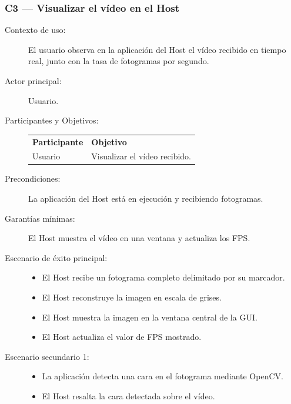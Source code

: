 \documentclass[../main.tex]{subfiles}
\begin{document}
\subsubsection{C3 --- Visualizar el vídeo en el Host}
\begin{description}
    \item[Contexto de uso:] El usuario observa en la aplicación del Host el vídeo recibido en tiempo real, junto con la tasa de fotogramas por segundo.
    \item[Actor principal:] Usuario.
    \item[Participantes y Objetivos:] \hfill
        
    \begin{tabular}{>{\raggedright\arraybackslash}p{3cm}>{\raggedright\arraybackslash}p{10cm}}
    \rowcolor[HTML]{156082}
    {\color{white}\textbf{Participante}} & {\color{white}\textbf{Objetivo}} \\
    \rowcolor[HTML]{C0E6F5}
    Usuario & Visualizar el vídeo recibido. \\
    \end{tabular}

    \item[Precondiciones:] La aplicación del Host está en ejecución y recibiendo fotogramas.
    \item[Garantías mínimas:] El Host muestra el vídeo en una ventana y actualiza los FPS.
    \item[Escenario de éxito principal:] \hfill
    \begin{itemize}
        \item El Host recibe un fotograma completo delimitado por su marcador.
        \item El Host reconstruye la imagen en escala de grises.
        \item El Host muestra la imagen en la ventana central de la GUI.
        \item El Host actualiza el valor de FPS mostrado.
    \end{itemize}
    \item[Escenario secundario 1:] \hfill
    \begin{itemize}
        \item La aplicación detecta una cara en el fotograma mediante OpenCV.
        \item El Host resalta la cara detectada sobre el vídeo.
    \end{itemize}
\end{description}
\end{document}
